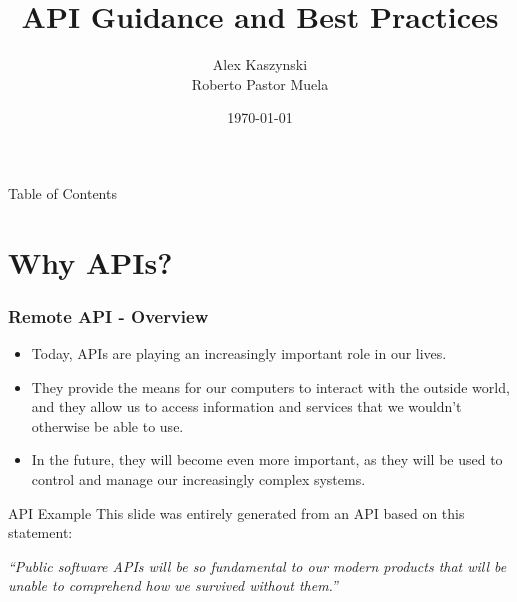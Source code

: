\documentclass[t]{beamer}
\begin{document}

\title{API Guidance and Best Practices}
\author{Alex Kaszynski \\ Roberto Pastor Muela}
\date{\today}

\titleframe{}



\begin{frame}{Table of Contents}
  \tableofcontents
  \vspace{200pt}  %
\end{frame}


\section{Why APIs?}

\begin{frame}[fragile=singleslide]
  \frametitle{Remote API - Overview}
  \vspace{-10pt}

  \begin{itemize}
  \item Today, APIs are playing an increasingly important role in our lives.
  \item They provide the means for our computers to interact with the outside world, and they allow us to access information and services that we wouldn't otherwise be able to use.
  \item In the future, they will become even more important, as they will be used to control and manage our increasingly complex systems.
  \end{itemize}

  \begin{exampleblock}{API Example}
    This slide was entirely generated from an API based on this statement:


    \textit{``Public software APIs will be so fundamental to our modern
      products that will be unable to comprehend how we survived without
      them.''}

  \end{exampleblock}

\end{frame}

\end{document}
